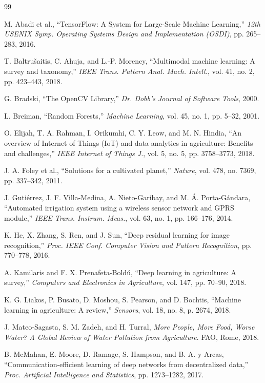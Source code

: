 \documentclass[10pt,twocolumn]{article}
\begin{document}
\begin{thebibliography}{99}
\small

 M. Abadi et al., ``TensorFlow: A System for Large-Scale Machine Learning,'' \textit{12th USENIX Symp. Operating Systems Design and Implementation (OSDI)}, pp. 265--283, 2016.

 T. Baltrušaitis, C. Ahuja, and L.-P. Morency, ``Multimodal machine learning: A survey and taxonomy,'' \textit{IEEE Trans. Pattern Anal. Mach. Intell.}, vol. 41, no. 2, pp. 423--443, 2018.

 G. Bradski, ``The OpenCV Library,'' \textit{Dr. Dobb's Journal of Software Tools}, 2000.

 L. Breiman, ``Random Forests,'' \textit{Machine Learning}, vol. 45, no. 1, pp. 5--32, 2001.

 O. Elijah, T. A. Rahman, I. Orikumhi, C. Y. Leow, and M. N. Hindia, ``An overview of Internet of Things (IoT) and data analytics in agriculture: Benefits and challenges,'' \textit{IEEE Internet of Things J.}, vol. 5, no. 5, pp. 3758--3773, 2018.

 J. A. Foley et al., ``Solutions for a cultivated planet,'' \textit{Nature}, vol. 478, no. 7369, pp. 337--342, 2011.

 J. Gutiérrez, J. F. Villa-Medina, A. Nieto-Garibay, and M. Á. Porta-Gándara, ``Automated irrigation system using a wireless sensor network and GPRS module,'' \textit{IEEE Trans. Instrum. Meas.}, vol. 63, no. 1, pp. 166--176, 2014.

 K. He, X. Zhang, S. Ren, and J. Sun, ``Deep residual learning for image recognition,'' \textit{Proc. IEEE Conf. Computer Vision and Pattern Recognition}, pp. 770--778, 2016.

 A. Kamilaris and F. X. Prenafeta-Boldú, ``Deep learning in agriculture: A survey,'' \textit{Computers and Electronics in Agriculture}, vol. 147, pp. 70--90, 2018.

 K. G. Liakos, P. Busato, D. Moshou, S. Pearson, and D. Bochtis, ``Machine learning in agriculture: A review,'' \textit{Sensors}, vol. 18, no. 8, p. 2674, 2018.

 J. Mateo-Sagasta, S. M. Zadeh, and H. Turral, \textit{More People, More Food, Worse Water? A Global Review of Water Pollution from Agriculture}. FAO, Rome, 2018.

 B. McMahan, E. Moore, D. Ramage, S. Hampson, and B. A. y Arcas, ``Communication-efficient learning of deep networks from decentralized data,'' \textit{Proc. Artificial Intelligence and Statistics}, pp. 1273--1282, 2017.


\end{thebibliography}
\end{document}
